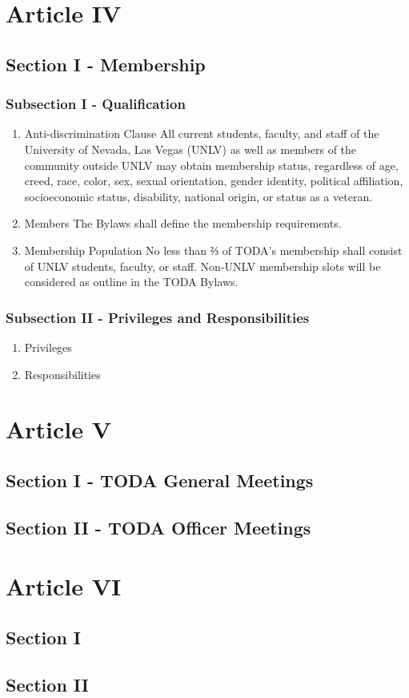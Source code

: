 \documentclass[11pt]{article}
\begin{document}
\section{Article IV}
\label{sec:orge02af52}
\subsection{Section I - Membership}
\label{sec:org464f14a}
\subsubsection{Subsection I - Qualification}
\label{sec:orga2dab06}
\begin{enumerate}
\item Anti-discrimination Clause
\label{sec:orgf9bfc5c}
All current students, faculty, and staff of the University of Nevada, Las Vegas (UNLV) as well as members of the community outside UNLV may obtain membership status, regardless of age, creed, race, color, sex, sexual orientation, gender identity, political affiliation, socioeconomic status, disability, national origin, or status as a veteran.
\item Members
\label{sec:org6a31938}
The Bylaws shall define the membership requirements.
\item Membership Population
\label{sec:orgda0053d}
No less than ⅔ of TODA’s membership shall consist of UNLV students, faculty, or staff. 
Non-UNLV membership slots will be considered as outline in the TODA Bylaws.
\end{enumerate}
\subsubsection{Subsection II - Privileges and Responsibilities}
\label{sec:org177f86b}
\begin{enumerate}
\item Privileges
\label{sec:orgda91822}

\item Responsibilities
\label{sec:org1e3d66a}
\end{enumerate}
\section{Article V}
\label{sec:org2cc47d5}
\subsection{Section I - TODA General Meetings}
\label{sec:org52e5cca}
\subsection{Section II - TODA Officer Meetings}
\label{sec:org4daa449}
\section{Article VI}
\label{sec:orgac2cfb3}
\subsection{Section I}
\label{sec:org921781e}
\subsection{Section II}
\label{sec:org104e131}
\end{document}
